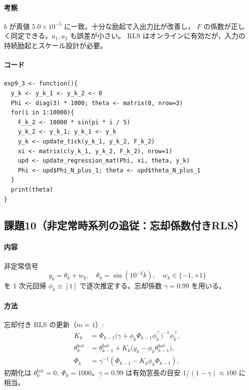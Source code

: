 \paragraph{考察}
$b$ が真値 $5.0\times10^{-5}$ に一致。十分な励起で入出力比が改善し，
$F$ の係数が正しく同定できる。$a_1,a_2$ も誤差が小さい。
RLS はオンラインに有効だが，入力の持続励起とスケール設計が必要。

\paragraph{コード}
\begin{lstlisting}
exp9_3 <- function(){
  y_k <- y_k_1 <- y_k_2 <- 0
  Phi <- diag(3) * 1000; theta <- matrix(0, nrow=3)
  for(i in 1:10000){
    F_k_2 <- 10000 * sin(pi * i / 5)
    y_k_2 <- y_k_1; y_k_1 <- y_k
    y_k <- update_tick(y_k_1, y_k_2, F_k_2)
    xi <- matrix(c(y_k_1, y_k_2, F_k_2), nrow=1)
    upd <- update_regression_mat(Phi, xi, theta, y_k)
    Phi <- upd$Phi_N_plus_1; theta <- upd$theta_N_plus_1
  }
  print(theta)
}
\end{lstlisting}


\subsection{課題10（非定常時系列の追従：忘却係数付きRLS）}

\paragraph{内容}
非定常信号
\[
y_k=\theta_k+w_k,\quad \theta_k=\sin(10^{-4}k),\quad w_k\in\{-1,+1\}
\]
を 1 次元回帰 $\phi_k\equiv[1]$ で逐次推定する。忘却係数 $\gamma=0.99$ を用いる。\cite{exp2025}

\paragraph{方法}
忘却付き RLS の更新（$m=1$）:
\[
\begin{aligned}
K_k&=\Phi_{k-1}\bigl(\gamma+\phi_k\Phi_{k-1}\phi_k^\top\bigr)^{-1}\phi_k^\top,\\
\theta_k^{\text{hat}}&=\theta_{k-1}^{\text{hat}}+K_k\bigl(y_k-\phi_k\theta_{k-1}^{\text{hat}}\bigr),\\
\Phi_k&=\gamma^{-1}\!\left(\Phi_{k-1}-K_k\phi_k\Phi_{k-1}\right),
\end{aligned}
\]
初期化は $\theta_0^{\text{hat}}=0,\ \Phi_0=1000$。$\gamma=0.99$ は有効窓長の目安 $1/(1-\gamma)\approx 100$ に相当。\cite{exp2025}

